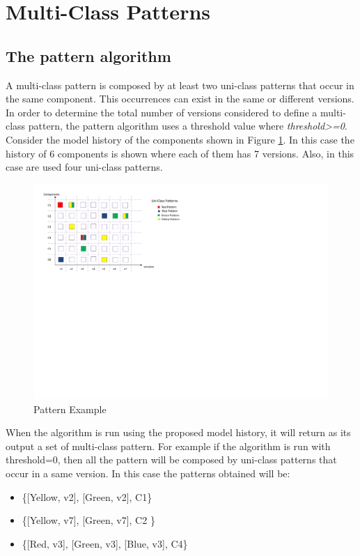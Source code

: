 \documentclass[11pt]{article} %
\begin{document}
\section{Multi-Class Patterns}
\subsection{The pattern algorithm}
A multi-class pattern is composed by at least two uni-class patterns that occur in the same component. This occurrences can exist in the same or different versions. In order to determine the total number of versions considered to define a multi-class pattern, the pattern algorithm uses a threshold value where \emph{threshold>=0}. 
Consider the model history of the components shown in Figure \ref{fig:exampleOfPatterns}. In this case the history of 6 components is shown where each of them has 7 versions. Also, in this case are used four uni-class patterns.  
\begin{figure}
  \centering
    \includegraphics[bb=25bp 490bp 580bp 810bp,clip,scale=0.75]{patterns}
  \caption{Pattern Example}
  \label{fig:exampleOfPatterns}
\end{figure}

When the algorithm is run using the proposed model history, it will return as its output a set of multi-class pattern. For example if the algorithm is run with threshold=0, then all the pattern will be composed by uni-class patterns that occur in a same version. In this case the patterns obtained will be: 
\begin{itemize}
\item \{[Yellow, v2], [Green, v2], C1\}
\item \{[Yellow, v7], [Green, v7], C2 \}
\item \{[Red, v3], [Green, v3], [Blue, v3], C4\}
\end{itemize}
\end{document}
